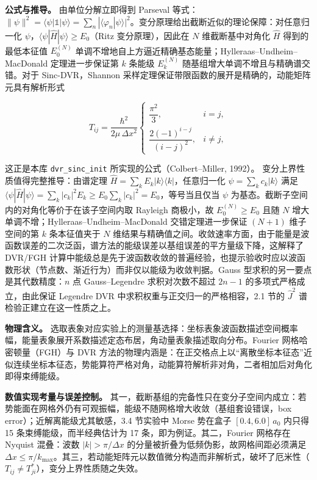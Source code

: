 \documentclass[
]{ctexbook}
\begin{document}
\textbf{公式与推导。} 由单位分解立即得到 Parseval
等式：\(\|\psi\|^{2}=\langle\psi|\mathbb{1}|\psi\rangle=\sum_n|\langle\varphi_n|\psi\rangle|^{2}\)。变分原理给出截断近似的理论保障：对任意归一化
\(\psi\)，\(\langle\psi|\hat{H}|\psi\rangle\ge E_0\)（Ritz
变分原理），因此在 \(N\) 维截断基中对角化 \(\hat{H}\) 得到的最低本征值
\(E_0^{(N)}\)
单调不增地自上方逼近精确基态能量；Hylleraas--Undheim--MacDonald
定理进一步保证第 \(k\) 条能级 \(E_k^{(N)}\)
随基组增大单调不增且与精确谱交错。对于 Sinc-DVR，Shannon
采样定理保证带限函数的展开是精确的，动能矩阵元具有解析形式

\[T_{ij}=\frac{\hbar^{2}}{2\mu\,\Delta x^{2}}
\begin{cases}
\dfrac{\pi^{2}}{3}, & i=j,\\[2mm]
\dfrac{2(-1)^{i-j}}{(i-j)^{2}}, & i\neq j,
\end{cases}\]

这正是本库 \texttt{dvr\_sinc\_init} 所实现的公式（Colbert--Miller,
1992）。 变分上界性质值得完整推导：由谱定理
\(\hat{H}=\sum_k E_k|k\rangle\langle k|\)，任意归一化
\(\psi=\sum_k c_k|k\rangle\) 满足
\(\langle\psi|\hat{H}|\psi\rangle=\sum_k|c_k|^{2}E_k\ge E_0\sum_k|c_k|^{2}=E_0\)，等号当且仅当
\(\psi\) 为基态。截断子空间内的对角化等价于在该子空间内取 Rayleigh
商极小，故 \(E_0^{(N)}\ge E_0\) 且随 \(N\)
增大单调不增；Hylleraas--Undheim--MacDonald 交错定理进一步保证 \((N+1)\)
维子空间的第 \(k\) 条本征值夹于 \(N\)
维结果与精确值之间。收敛速率方面，由于能量是波函数误差的二次泛函，谱方法的能级误差以基组误差的平方量级下降，这解释了
DVR/FGH
计算中能级总是先于波函数收敛的普遍经验，也提示验收时应以波函数形状（节点数、渐近行为）而非仅以能级为收敛判据。Gauss
型求积的另一要点是其代数精度：\(n\) 点 Gauss--Legendre 求积对次数不超过
\(2n-1\) 的多项式严格成立，由此保证 Legendre DVR
中求积权重与正交归一的严格相容，2.1 节的 \(\hat{J}^{2}\)
谱检验正建立在这一性质之上。

\textbf{物理含义。}
选取表象对应实验上的测量基选择：坐标表象波函数描述空间概率幅，能量表象展开系数描述定态布居，角动量表象描述取向分布。Fourier
网格哈密顿量（FGH）与 DVR
方法的物理内涵是：在正交格点上以``离散坐标本征态''近似连续坐标本征态，势能算符严格对角，动能算符解析非对角，二者相加后对角化即得束缚能级。

\textbf{数值实现考量与误差控制。}
其一，截断基组的完备性只在变分子空间内成立：若势能面在网格外仍有可观振幅，能级不随网格增大收敛（基组套设错误，box
error）；近解离能级尤其敏感，3.4 节实验中 Morse 势在盒子
\([0.4,6.0]\,a_0\) 内只得 15 条束缚能级，而半经典估计为 17
条，即为例证。其二，Fourier 网格存在 Nyquist 混叠：波数
\(|k|>\pi/\Delta x\) 的分量被折叠为低频伪影，故网格间距必须满足
\(\Delta x\le\pi/k_{\max}\)。其三，若动能矩阵元以数值微分构造而非解析式，破坏了厄米性（\(T_{ij}\neq T_{ji}^{*}\)），变分上界性质随之失效。
\end{document}
